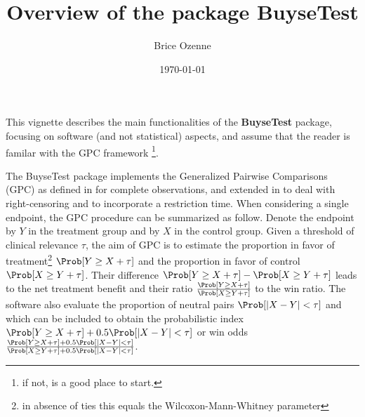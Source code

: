 \documentclass[12pt]{article}
\author{Brice Ozenne}
\date{\today}
\title{Overview of the package BuyseTest}
\begin{document}
\maketitle
This vignette describes the main functionalities of the \textbf{BuyseTest}
package, focusing on software (and not statistical) aspects, and assume
that the reader is familar with the GPC framework \footnote{if not,
\cite{buyse2010generalized} is a good place to start.}.

\bigskip

The BuyseTest package implements the Generalized Pairwise Comparisons
(GPC) as defined in \cite{buyse2010generalized} for complete
observations, and extended in \cite{peron2018extension} to deal with
right-censoring and \cite{piffoux2024restricted} to incorporate a
restriction time. When considering a single endpoint, the GPC
procedure can be summarized as follow. Denote the endpoint by \(Y\) in
the treatment group and by \(X\) in the control group. Given a
threshold of clinical relevance \(\tau\), the aim of GPC is to
estimate the proportion in favor of treatment\footnote{in absence of ties
this equals the Wilcoxon-Mann-Whitney parameter} \(\Prob[Y \geq X +
\tau]\) and the proportion in favor of control \(\Prob[X \geq Y +
\tau]\). Their difference \(\Prob[Y \geq X + \tau]-\Prob[X \geq Y +
\tau]\) leads to the net treatment benefit and their ratio
\(\frac{\Prob[Y \geq X + \tau]}{\Prob[X \geq Y + \tau]}\) to the win
ratio. The software also evaluate the proportion of neutral pairs
\(\Prob[ |X - Y| < \tau]\) and which can be included to obtain the
probabilistic index \(\Prob[Y \geq X + \tau] + 0.5 \Prob[ |X - Y| <
\tau]\) or win odds \(\frac{\Prob[Y \geq X + \tau] + 0.5 \Prob[ |X -
Y| < \tau] }{\Prob[X \geq Y + \tau] + 0.5\Prob[ |X - Y| < \tau]}\).
\end{document}
